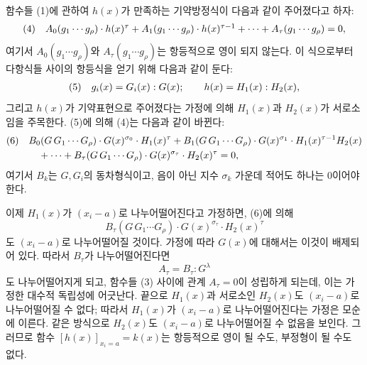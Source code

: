 함수들 (1)에 관하여 $h(x)$가 만족하는 기약방정식이 다음과 같이 주어졌다고 하자:
\[
\begin{array}{@{}r@{\quad}l@{}}
(4)& A_0(g_1\cdots g_\rho)\cdot h(x)^\tau
 +A_1(g_1\cdots g_\rho)\cdot h(x)^{\tau-1}
 +\cdots+A_\tau(g_1\cdots g_\rho)=0,
\end{array}
\]
여기서 $A_0(g_1\cdots g_\rho)$와 $A_\tau(g_1\cdots g_\rho)$는 항등적으로 영이 되지 않는다. 이 식으로부터 다항식들 사이의 항등식을 얻기 위해 다음과 같이 둔다:
\[
\begin{array}{@{}r@{\quad}l@{}}
(5)& g_i(x)=G_i(x):G(x);\qquad h(x)=H_1(x):H_2(x),
\end{array}
\]
그리고 $h(x)$가 기약표현으로 주어졌다는 가정에 의해 $H_1(x)$과 $H_2(x)$가 서로소임을 주목한다. (5)에 의해 (4)는 다음과 같이 바뀐다:
\[
\begin{array}{@{}r@{\quad}l@{}}
(6)& \begin{aligned}[t]
&B_0(G\,G_1\cdots G_\rho)\cdot G(x)^{\sigma_0}\cdot H_1(x)^\tau
+B_1(G\,G_1\cdots G_\rho)\cdot G(x)^{\sigma_1}\cdot H_1(x)^{\tau-1}H_2(x)\\
&\quad+\cdots+B_\tau(G\,G_1\cdots G_\rho)\cdot G(x)^{\sigma_\tau}\cdot H_2(x)^\tau=0,
\end{aligned}
\end{array}
\]
여기서 $B_k$는 $G,G_i$의 동차형식이고, 음이 아닌 지수 $\sigma_k$ 가운데 적어도 하나는 0이어야 한다.

이제 $H_1(x)$가 $(x_i-a)$로 나누어떨어진다고 가정하면, (6)에 의해
\[
  B_\tau(G\,G_1\cdots G_\rho)\cdot G(x)^{\sigma_\tau}\cdot H_2(x)^\tau
\]
도 $(x_i-a)$로 나누어떨어질 것이다. 가정에 따라 $G(x)$에 대해서는 이것이 배제되어 있다. 따라서 $B_\tau$가 나누어떨어진다면
\[
  A_\tau=B_\tau:G^\lambda
\]
도 나누어떨어지게 되고, 함수들 (3) 사이에 관계 $A_\tau=0$이 성립하게 되는데, 이는 가정한 대수적 독립성에 어긋난다.
끝으로 $H_1(x)$과 서로소인 $H_2(x)$도 $(x_i-a)$로 나누어떨어질 수 없다; 따라서 $H_1(x)$가 $(x_i-a)$로 나누어떨어진다는 가정은 모순에 이른다. 같은 방식으로 $H_2(x)$도 $(x_i-a)$로 나누어떨어질 수 없음을 보인다. 그러므로 함수 $[h(x)]_{x_i=a}=k(x)$는 항등적으로 영이 될 수도, 부정형이 될 수도 없다.

